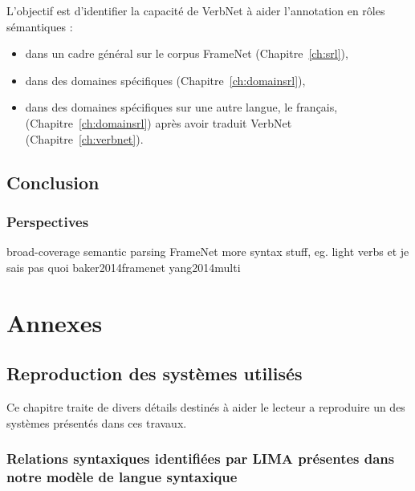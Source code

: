 \documentclass[oneside,parskip,draft]{scrbook}
\begin{document}
L'objectif est d'identifier la capacité de VerbNet à aider l'annotation en
rôles sémantiques :
\begin{itemize}
    \item dans un cadre général sur le corpus FrameNet (Chapitre~\ref{ch:srl}),
    \item dans des domaines spécifiques (Chapitre~\ref{ch:domainsrl}),
    \item dans des domaines spécifiques sur une autre langue, le français, (Chapitre~\ref{ch:domainsrl}) après avoir traduit VerbNet (Chapitre~\ref{ch:verbnet}).
\end{itemize}





\chapter*{Conclusion}
\label{ch:conc}

\section{Perspectives}

broad-coverage semantic parsing
FrameNet more syntax stuff, eg. light verbs et je sais pas quoi baker2014framenet yang2014multi

\backmatter




\part{Annexes}

\chapter{Reproduction des systèmes utilisés}

Ce chapitre traite de divers détails destinés à aider le lecteur a reproduire
un des systèmes présentés dans ces travaux.

\section{Relations syntaxiques identifiées par LIMA présentes dans notre modèle
de langue syntaxique}
\label{relations_modele_langue}
\end{document}
